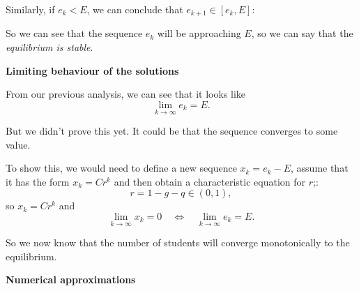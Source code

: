 Similarly, if $e_k < E$, we can conclude that $e_{k+1} \in [e_k,E]$:
\begin{center}
\end{center}


So we can see that the sequence $e_k$ will be approaching $E$, so we can say that the \emph{equilibrium is stable}.






\hfill

\begin{center}
\textbf{\color{cyan}
Limiting behaviour of the solutions
}
\end{center}



From our previous analysis, we can see that it looks like 
$$
\lim_{k \to \infty} e_k = E.
$$

But we didn't prove this yet. It could be that the sequence converges to some value. 

To show this, we would need to define a new sequence $x_k = e_k-E$, assume that it has the form $x_k = C r^k$ and then obtain a characteristic equation for $r$;:
$$
r = 1-g-q \in (0,1),
$$
so $x_k = C r^k$ and 
$$
\lim_{k \to \infty} x_k = 0
\quad \Leftrightarrow \quad
	\lim_{k \to \infty} e_k = E.
$$

So we now know that the number of students will converge monotonically to the equilibrium.


\hfill

\begin{center}
\textbf{\color{cyan}
Numerical approximations
}
\end{center}


